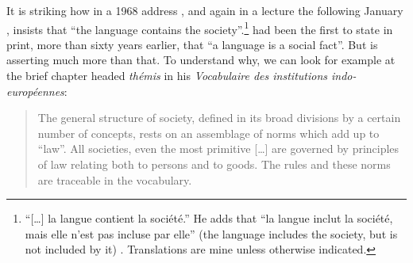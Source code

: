 \documentclass[output=paper]{langscibook}
\begin{document}
It is striking how in a 1968 address \citep[95]{Benveniste1970structure}, and again in a lecture the following January \citep[79]{Benveniste2012}, {\Benveniste} insists that ``the language contains the society''\label{q:joseph:langcontainssoc}.\footnote{``[…] la langue contient la société.'' He adds that ``la langue inclut la société, mais elle n’est pas incluse par elle'' (the language includes the society, but is not included by it) \citep[96]{Benveniste1970structure}. Translations are mine unless otherwise indicated.} \citet{Meillet190506} had been the first to state in print, more than sixty years earlier, that ``a language is a social fact''. But {\Benveniste} is asserting much more than that. To understand why, we can look for example at the brief chapter headed \emph{thémis} in his \emph{Vocabulaire des institutions indo-européennes}:

\begin{quotation}
The general structure of society, defined in its broad divisions by a certain number of concepts, rests on an assemblage of norms which add up to ``law''. All societies, even the most primitive […] are governed by principles of law relating both to persons and to goods. The rules and these norms are traceable in the vocabulary.
\end{quotation}
\end{document}
